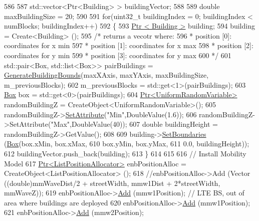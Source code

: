 \begin{DoxyCode}
{586 
587   std::vector<Ptr<Building> > buildingVector;
588 
589   \textcolor{keywordtype}{double} maxBuildingSize = 20;
590 
591   \textcolor{keywordflow}{for}(uint32\_t buildingIndex = 0; buildingIndex < numBlocks; buildingIndex++)
592   \{
593     \hyperlink{classns3_1_1Ptr}{Ptr < Building >} building;
594       building = Create<Building> ();
595       \textcolor{comment}{/* returns a vecotr where:}
596 \textcolor{comment}{      * position [0]: coordinates for x min}
597 \textcolor{comment}{      * position [1]: coordinates for x max}
598 \textcolor{comment}{      * position [2]: coordinates for y min}
599 \textcolor{comment}{      * position [3]: coordinates for y max}
600 \textcolor{comment}{      */}
601       std::pair<Box, std::list<Box>> pairBuildings = \hyperlink{mc-twoenbs_8cc_a44ed24f55f9249a5cb23a36d126def78}{GenerateBuildingBounds}(maxXAxis,
       maxYAxis, maxBuildingSize, m\_previousBlocks);
602       m\_previousBlocks = std::get<1>(pairBuildings);
603       \hyperlink{classns3_1_1Box}{Box} box = std::get<0>(pairBuildings);
604       \hyperlink{classns3_1_1Ptr}{Ptr<UniformRandomVariable>} randomBuildingZ = 
      CreateObject<UniformRandomVariable>();
605       randomBuildingZ->\hyperlink{classns3_1_1ObjectBase_ac60245d3ea4123bbc9b1d391f1f6592f}{SetAttribute}(\textcolor{stringliteral}{"Min"},DoubleValue(1.6));
606       randomBuildingZ->SetAttribute(\textcolor{stringliteral}{"Max"},DoubleValue(40));
607       \textcolor{keywordtype}{double} buildingHeight = randomBuildingZ->GetValue();
608 
609       building->\hyperlink{classns3_1_1Building_a4b69659f05a983f06e33e7db62415915}{SetBoundaries} (\hyperlink{classns3_1_1Box}{Box}(box.xMin, box.xMax,
610                                     box.yMin,  box.yMax,
611                                     0.0, buildingHeight));
612       buildingVector.push\_back(building);
613   \}
614 
615 
616   \textcolor{comment}{// Install Mobility Model}
617   \hyperlink{classns3_1_1Ptr}{Ptr<ListPositionAllocator>} enbPositionAlloc = 
      CreateObject<ListPositionAllocator> ();
618   \textcolor{comment}{//enbPositionAlloc->Add (Vector ((double)mmWaveDist/2 + streetWidth, mmw1Dist + 2*streetWidth, mmWaveZ));}
619   enbPositionAlloc->\hyperlink{classns3_1_1ListPositionAllocator_a460e82f015ac012a73ba0ea0cccb3486}{Add} (mmw1Position); \textcolor{comment}{// LTE BS, out of area where buildings are deployed}
620   enbPositionAlloc->\hyperlink{classns3_1_1ListPositionAllocator_a460e82f015ac012a73ba0ea0cccb3486}{Add} (mmw1Position);
621   enbPositionAlloc->\hyperlink{classns3_1_1ListPositionAllocator_a460e82f015ac012a73ba0ea0cccb3486}{Add} (mmw2Position);
}
\end{DoxyCode}
